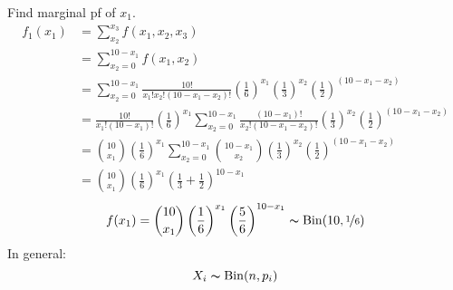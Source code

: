 Find marginal pf of $ {x_1} $.
\begin{align*}
    f_1({x_1})&=\sum\limits_{{x_2}}^{{x_3}} f({x_1},{x_2},{x_3})\\
    &=\sum\limits_{{x_2}=0}^{10-{x_1}} f({x_1},{x_2})\\
    &=\sum\limits_{{x_2}=0}^{10-{x_1}} \frac{10!}{{x_1}!{x_2}!(10-{x_1}-{x_2})!}
    \left( \frac{1}{6} \right)^{x_1} 
    \left( \frac{1}{3} \right)^{x_2} \left( \frac{1}{2} \right)^{(10-{x_1}-{x_2})}\\
    &=\frac{10!}{{x_1}!(10-{x_1})!}\left( \frac{1}{6}  \right)^{x_1}
    \sum\limits_{{x_2}=0}^{10-{x_1}} \frac{(10-{x_1})!}{{x_2}!(10-{x_1}-{x_2})!}
    \left( \frac{1}{3} \right)^{x_2} \left( \frac{1}{2} \right)^{(10-{x_1}-{x_2})}\\
    &=\binom{10}{{x_1}}\left( \frac{1}{6}  \right)^{x_1}
    \sum\limits_{{x_2}=0}^{10-{x_1}} \binom{10-{x_1}}{{x_2}}
    \left( \frac{1}{3} \right)^{x_2} \left( \frac{1}{2} \right)^{(10-{x_1}-{x_2})}\\
    &=\binom{10}{{x_1}}\left( \frac{1}{6}  \right)^{x_1}
    \left(\frac{1}{3}+\frac{1}{2} \right)^{10-x_1}
\end{align*}
\[ f(x_1)=\binom{10}{{x_1}}\left( \frac{1}{6}  \right)^{x_1}
\left(\frac{5}{6} \right)^{10-x_1} \thicksim \operatorname{Bin}(10,\nicefrac{1}{6} )\]
In general:
\[ X_i \thicksim \operatorname{Bin}(n,p_i) \]



